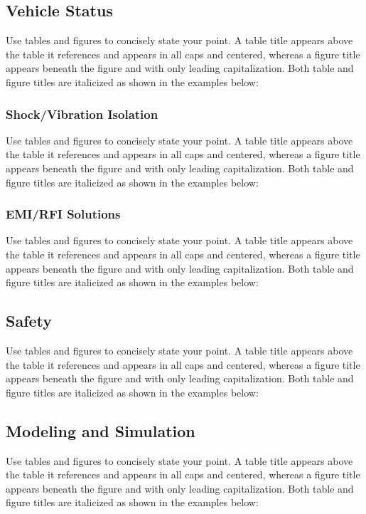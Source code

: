 \documentclass[12pt, letterpaper]{article}
\begin{document}
\subsection{Vehicle Status}
Use tables and figures to concisely state your point. A table title appears above the table it references and appears in all caps and centered, whereas a figure title appears beneath the figure and with only leading capitalization. Both table and figure titles are italicized as shown in the examples below:

\subsubsection{Shock/Vibration Isolation}
Use tables and figures to concisely state your point. A table title appears above the table it references and appears in all caps and centered, whereas a figure title appears beneath the figure and with only leading capitalization. Both table and figure titles are italicized as shown in the examples below:

\subsubsection{EMI/RFI Solutions}
Use tables and figures to concisely state your point. A table title appears above the table it references and appears in all caps and centered, whereas a figure title appears beneath the figure and with only leading capitalization. Both table and figure titles are italicized as shown in the examples below:

\subsection{Safety}
Use tables and figures to concisely state your point. A table title appears above the table it references and appears in all caps and centered, whereas a figure title appears beneath the figure and with only leading capitalization. Both table and figure titles are italicized as shown in the examples below:

\subsection{Modeling and Simulation}
Use tables and figures to concisely state your point. A table title appears above the table it references and appears in all caps and centered, whereas a figure title appears beneath the figure and with only leading capitalization. Both table and figure titles are italicized as shown in the examples below:
\end{document}

